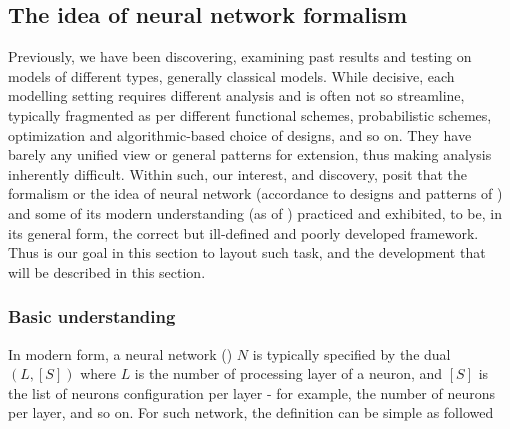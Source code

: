 \documentclass[
  journal=largetwo,
  year=2025,
  volume=37,
]{cup-journal}
\begin{document}
\subsection{The idea of neural network formalism}
Previously, we have been discovering, examining past results and testing on models of different types, generally classical models. While decisive, each modelling setting requires different analysis and is often not so streamline, typically fragmented as per different functional schemes, probabilistic schemes, optimization and algorithmic-based choice of designs, and so on. They have barely any unified view or general patterns for extension, thus making analysis inherently difficult. Within such, our interest, and discovery, posit that the formalism or the idea of neural network (accordance to designs and patterns of \cite{mcculloch_pitts_1943,hebb_1949,rosenblatt_1958,widrow_hoff_1960_adaline,minsky_papert_1969,fukushima_1980,kohonen_1982,hopfield_1982,werbos_1974,rumelhart_hinton_williams_1986,cybenko_1989,hornik_1991,hochreiter_schmidhuber_1997,lecun_bottou_bengio_haffner_1998,bishop_1995,haykin_1994}) and some of its modern understanding (as of \cite{goodfellow2016deep,zhang2023mathematical,hinton_osindero_teh_2006,lecun_bengio_hinton_2015,goodfellow_et_al_2014,srivastava_hinton_2014_dropout,szegedy_2014_inception,simonyan_zisserman_2014_vgg,vaswani_et_al_2017_transformer,he_zhang_ren_sun_2016_resnet,devlin_2018_bert,brown_et_al_2020_gpt3}) practiced and exhibited, to be, in its general form, the correct but ill-defined and poorly developed framework. Thus is our goal in this section to layout such task, and the development that will be described in this section. 

\subsubsection{Basic understanding}

In modern form, a neural network (\cite{goodfellow2016deep,zhang2023mathematical}) $N$ is typically specified by the dual $(L,[S])$ where $L$ is the number of processing layer of a neuron, and $[S]$ is the list of neurons configuration per layer - for example, the number of neurons per layer, and so on. For such network, the definition can be simple as followed 
\end{document}
